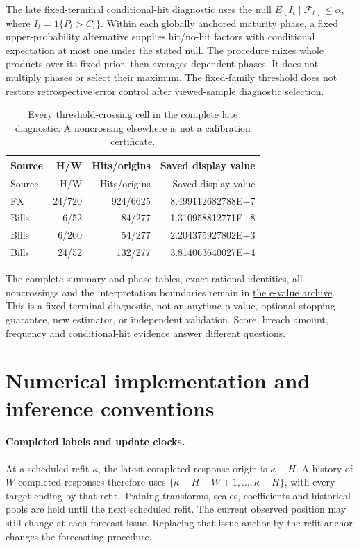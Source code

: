 \documentclass[11pt,a4paper]{article}
\begin{document}
The late fixed-terminal conditional-hit diagnostic uses the null
\(E[I_t\mid\mathcal F_t]\le\alpha\), where \(I_t=1\{P_t>C_t\}\).
Within each globally anchored maturity phase, a fixed upper-probability
alternative supplies hit/no-hit factors with conditional expectation at most
one under the stated null. The procedure mixes whole products over its fixed
prior, then averages dependent phases. It does not multiply phases or select
their maximum. The fixed-family threshold does not restore retrospective
error control after viewed-sample diagnostic selection.
\begingroup
\small
\setlength{\tabcolsep}{3pt}
\renewcommand{\arraystretch}{1.12}
\begin{longtable}{lrrr}
\caption{Every threshold-crossing cell in the complete late diagnostic. A noncrossing elsewhere is not a calibration certificate.}\\
\toprule
Source & H/W & Hits/origins & Saved display value \\
\midrule
\endfirsthead
\toprule
Source & H/W & Hits/origins & Saved display value \\
\midrule
\endhead
\bottomrule
\endfoot
FX & 24/720 & 924/6625 & 8.499112682788E+7 \\
Bills & 6/52 & 84/277 & 1.310958812771E+8 \\
Bills & 6/260 & 54/277 & 2.204375927802E+3 \\
Bills & 24/52 & 132/277 & 3.814063640027E+4 \\
\end{longtable}
\endgroup

The complete summary and phase tables, exact rational identities,
all noncrossings and the interpretation boundaries remain in
\href{https://github.com/ByronLi0207/financial-mathematics-paper-20261020/blob/revision-v7-final/results/revision-20261022/coverage-evalues/README.md}{the e-value archive}.
This is a fixed-terminal diagnostic, not an anytime p value, optional-stopping
guarantee, new estimator, or independent validation. Score, breach amount,
frequency and conditional-hit evidence answer different questions.\section{Numerical implementation and inference conventions}\label{sup:implementation}

\paragraph{Completed labels and update clocks.}
At a scheduled refit \(\kappa\), the latest completed response origin is
\(\kappa-H\). A history of \(W\) completed responses therefore uses
\(\{\kappa-H-W+1,\ldots,\kappa-H\}\), with every target ending by that refit.
Training transforms, scales, coefficients and historical pools are held until
the next scheduled refit. The current observed position may still change at
each forecast issue. Replacing that issue anchor by the refit anchor changes
the forecasting procedure.
\end{document}
